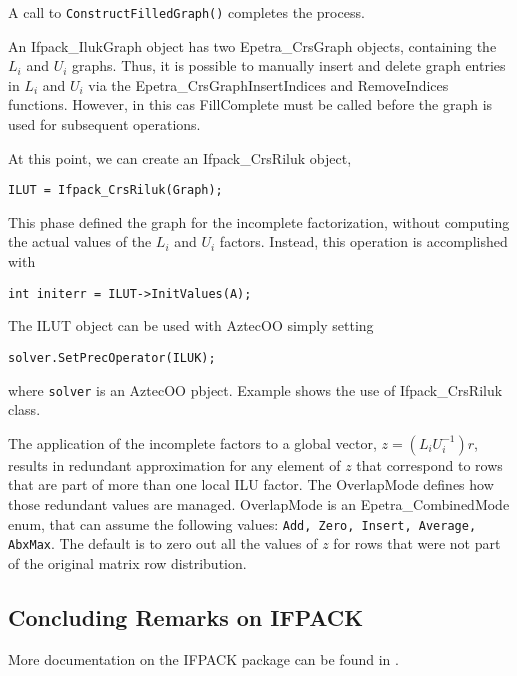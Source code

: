 A call to \verb!ConstructFilledGraph()! completes the process.

\begin{remark}
  An Ifpack\_IlukGraph object has two Epetra\_CrsGraph objects,
  containing the $L_i$ and $U_i$ graphs. Thus, it is possible to
  manually insert and delete graph entries in $L_i$ and $U_i$ via the
  Epetra\_CrsGraphInsertIndices and RemoveIndices functions. However, in
  this cas FillComplete must be called before the graph is used for
  subsequent operations.
\end{remark}

At this point, we can create an Ifpack\_CrsRiluk object,
\begin{verbatim}
ILUT = Ifpack_CrsRiluk(Graph);
\end{verbatim}
This phase defined the graph for the incomplete factorization, without
computing the actual values of the $L_i$ and $U_i$ factors. Instead,
this operation is accomplished with
\begin{verbatim}
int initerr = ILUT->InitValues(A);
\end{verbatim}
The ILUT object can be used with AztecOO simply setting
\begin{verbatim}
solver.SetPrecOperator(ILUK);
\end{verbatim}
where \verb!solver! is an AztecOO pbject.
\smallskip
Example  shows the use of Ifpack\_CrsRiluk class.

\medskip

The application of the incomplete factors to a global vector, $z =
(L_iU_i^{-1}) r$, results in redundant approximation for any element of
$z$ that correspond to rows that are part of more than one local ILU
factor. The OverlapMode defines how those redundant values are managed.
OverlapMode is an Epetra\_CombinedMode enum, that can assume the
following values: {\tt Add, Zero, Insert, Average, AbxMax}. The default
is to zero out all the values of $z$ for rows that were not part of the
original matrix row distribution.




\subsection{Concluding Remarks on IFPACK}
\label{sec:ifpack_concluding}

More documentation on the IFPACK package can be found in
\cite{Ifpack-Ref-Guide,Ifpack-User-Guide}.

